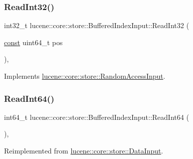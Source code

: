 \subsubsection{\texorpdfstring{Read\+Int32()}{ReadInt32()}\hspace{0.1cm}{\footnotesize\ttfamily [2/2]}}
{\footnotesize\ttfamily int32\+\_\+t lucene\+::core\+::store\+::\+Buffered\+Index\+Input\+::\+Read\+Int32 (\begin{DoxyParamCaption}\item[{\mbox{\hyperlink{ZlibCrc32_8h_a2c212835823e3c54a8ab6d95c652660e}{const}} uint64\+\_\+t}]{pos }\end{DoxyParamCaption})\hspace{0.3cm}{\ttfamily [inline]}, {\ttfamily [virtual]}}



Implements \mbox{\hyperlink{classlucene_1_1core_1_1store_1_1RandomAccessInput_a3deffb5fe76279f2632b9aee859680a8}{lucene\+::core\+::store\+::\+Random\+Access\+Input}}.

\mbox{\label{classlucene_1_1core_1_1store_1_1BufferedIndexInput_a1df116d1285059a70aff7cb2ede46906}} 
\subsubsection{\texorpdfstring{Read\+Int64()}{ReadInt64()}\hspace{0.1cm}{\footnotesize\ttfamily [1/2]}}
{\footnotesize\ttfamily int64\+\_\+t lucene\+::core\+::store\+::\+Buffered\+Index\+Input\+::\+Read\+Int64 (\begin{DoxyParamCaption}{ }\end{DoxyParamCaption})\hspace{0.3cm}{\ttfamily [inline]}, {\ttfamily [virtual]}}



Reimplemented from \mbox{\hyperlink{classlucene_1_1core_1_1store_1_1DataInput_a60310365f3d2d4e7b9dda79b00cc355b}{lucene\+::core\+::store\+::\+Data\+Input}}.

\mbox{\label{classlucene_1_1core_1_1store_1_1BufferedIndexInput_a500b3dc2413232d351407e84678724c6}} 
